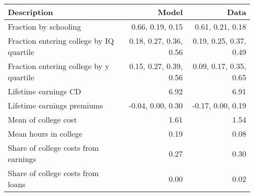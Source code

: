 \begin{tabular}{lrr}
\hline
Description & Model  & Data  \\ 
\hline
Fraction by schooling & 0.66, 0.19, 0.15  & 0.61, 0.21, 0.18  \\ 
Fraction entering college by IQ quartile & 0.18, 0.27, 0.36, 0.56  & 0.19, 0.25, 0.37, 0.49  \\ 
Fraction entering college by y quartile & 0.15, 0.27, 0.39, 0.56  & 0.09, 0.17, 0.35, 0.65  \\ 
Lifetime earnings CD & 6.92  & 6.91  \\ 
Lifetime earnings premiums & -0.04, 0.00, 0.30  & -0.17, 0.00, 0.19  \\ 
Mean of college cost & 1.61  & 1.54  \\ 
Mean hours in college & 0.19  & 0.08  \\ 
Share of college costs from earnings & 0.27  & 0.30  \\ 
Share of college costs from loans & 0.00  & 0.02  \\ 
\hline
\end{tabular}%
